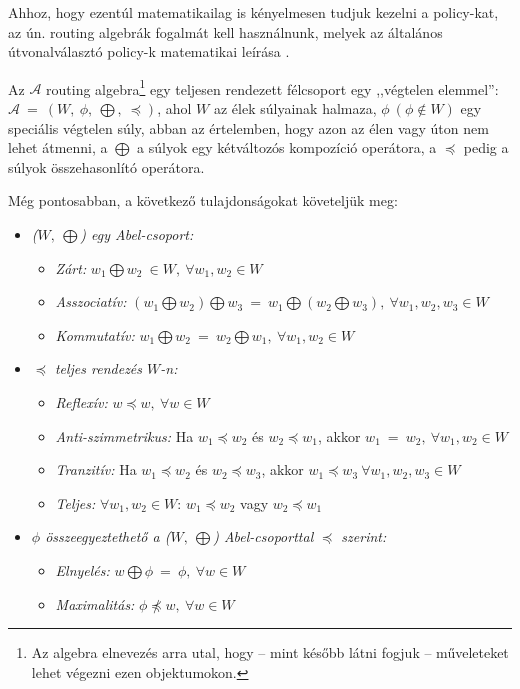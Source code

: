   Ahhoz, hogy ezentúl matematikailag is kényelmesen tudjuk kezelni a policy-kat, az ún. routing algebrák fogalmát kell használnunk, melyek az általános útvonalválasztó policy-k matematikai leírása \cite{Sobrinho_Algebra_and_Algorithms, Compact_Policy_Routing}.

  \begin{definition} 
    Az $\mathcal{A}$ routing algebra\footnote{Az algebra elnevezés arra utal, hogy -- mint később látni fogjuk -- műveleteket lehet végezni ezen objektumokon.} egy teljesen rendezett félcsoport egy ,,végtelen elemmel'': $\mathcal{A}~=~(W,~\phi,~\bigoplus,~\preceq)$, ahol $W$ az élek súlyainak halmaza, $\phi~(\phi \notin W)$ egy speciális végtelen súly, abban az értelemben, hogy azon az élen vagy úton nem lehet átmenni, a $\bigoplus$ a súlyok egy kétváltozós kompozíció operátora, a $\preceq$ pedig a súlyok összehasonlító operátora.
  \end{definition}

  Még pontosabban, a következő tulajdonságokat követeljük meg:
  \begin{itemize}
    \item \emph{ ($W,~\bigoplus$) egy Abel-csoport:}
    \begin{itemize}
    \item \emph{ Zárt:} $w_{1} \bigoplus w_{2}~\in W, ~\forall w_{1}, w_{2}\in W$
    \item \emph{ Asszociatív:} $(w_{1} \bigoplus w_{2}) \bigoplus w_{3}~=~w_{1} \bigoplus (w_{2} \bigoplus w_{3}),~\forall w_{1}, w_{2}, w_{3}\in W$
    \item \emph{ Kommutatív:} $w_{1} \bigoplus w_{2}~=~w_{2} \bigoplus w_{1},~\forall w_{1}, w_{2}\in W$
    \end{itemize}
    \item \emph{ $\preceq$ teljes rendezés $W$-n:}
    \begin{itemize}
    \item \emph{ Reflexív:} $w \preceq w,~\forall w \in W$
    \item \emph{ Anti-szimmetrikus:} Ha $w_{1} \preceq w_{2}$ és $w_{2} \preceq w_{1}$, akkor $w_{1} ~=~ w_{2},~\forall w_{1}, w_{2} \in W$
    \item \emph{ Tranzitív:} Ha $w_{1} \preceq w_{2}$ és $w_{2} \preceq w_{3}$, akkor $w_{1} \preceq w_{3}~\forall w_{1}, w_{2}, w_{3} \in W$
    \item \emph{ Teljes:} $\forall w_{1}, w_{2} \in W$: $w_{1} \preceq w_{2}$ vagy $w_{2} \preceq w_{1}$
    \end{itemize}
    \item \emph{ $\phi$ összeegyeztethető a ($W,~\bigoplus$) Abel-csoporttal $\preceq$ szerint:}
    \begin{itemize}
    \item \emph{ Elnyelés:} $w \bigoplus \phi ~=~ \phi, ~\forall w \in W$
    \item \emph{ Maximalitás:} $\phi \npreceq w, ~\forall w \in W$
    \end{itemize}
  \end{itemize}

